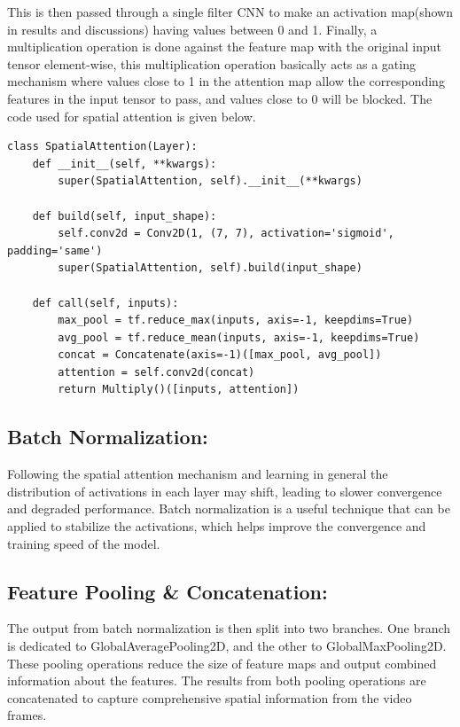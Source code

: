 \noindent This is then passed through a single filter CNN to make an activation map(shown in results and discussions) having values between 0 and 1. Finally, a multiplication operation is done against the feature map with the original input tensor element-wise, this multiplication operation basically acts as a gating mechanism where values close to 1 in the attention map allow the corresponding features in the input tensor to pass, and values close to 0 will be blocked. The code used for spatial attention is given below.


\begin{lstlisting}
class SpatialAttention(Layer):
    def __init__(self, **kwargs):
        super(SpatialAttention, self).__init__(**kwargs)

    def build(self, input_shape):
        self.conv2d = Conv2D(1, (7, 7), activation='sigmoid', padding='same')
        super(SpatialAttention, self).build(input_shape)

    def call(self, inputs):
        max_pool = tf.reduce_max(inputs, axis=-1, keepdims=True)
        avg_pool = tf.reduce_mean(inputs, axis=-1, keepdims=True)
        concat = Concatenate(axis=-1)([max_pool, avg_pool])
        attention = self.conv2d(concat)
        return Multiply()([inputs, attention])
\end{lstlisting}


\subsection{Batch Normalization:}

\noindent Following the spatial attention mechanism and learning in general the distribution of activations in each layer may shift, leading to slower convergence and degraded performance. Batch normalization is a useful technique that can be applied to stabilize the activations, which helps improve the convergence and training speed of the model.

\subsection{Feature Pooling \& Concatenation:}

The output from batch normalization is then split into two branches. One branch is dedicated to GlobalAveragePooling2D, and the other to GlobalMaxPooling2D. These pooling operations reduce the size of feature maps and output combined information about the features. The results from both pooling operations are concatenated to capture comprehensive spatial information from the video frames.

